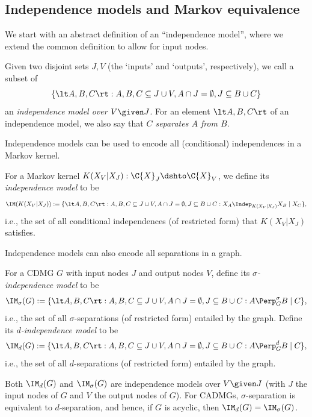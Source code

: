 \subsection{Independence models and Markov equivalence}

We start with an abstract definition of an ``independence model'', where we extend the common definition to allow for input nodes.
\begin{Def}\label{def:independence_model}
  Given two disjoint sets $J,V$ (the `inputs' and `outputs', respectively), we call a subset of 
  $$\{ \lt A, B, C \rt : A, B, C \subseteq J \cup V, A \cap J = \emptyset, J \subseteq B \cup C  \}$$
  an \emph{independence model over $V \given J$}.
  For an element $\lt A, B, C \rt$ of an independence model, we also say that \emph{$C$ separates $A$ from $B$}.
\end{Def}

Independence models can be used to encode all (conditional) independences in a Markov kernel.
\begin{Def}\label{def:independence_model_Markov_kernel}
  For a Markov kernel $K(X_V|X_J) : \C{X}_J \dshto \C{X}_V$, we define its \emph{independence model} to be
  $$\IM(K(X_V | X_J)) := \{ \lt A, B, C \rt : A, B, C \subseteq J \cup V, A \cap J = \emptyset, J \subseteq B \cup C : X_A \Indep_{K(X_V | X_J)} X_B \mid X_C \},$$
  i.e., the set of all conditional independences (of restricted form) that $K(X_V|X_J)$ satisfies.
\end{Def}

Independence models can also encode all separations in a graph.
\begin{Def}\label{def:independence_model_graph}
  For a CDMG $G$ with input nodes $J$ and output nodes $V$, define its \emph{$\sigma$-independence model} to be
  $$\IM_\sigma(G) := \{ \lt A, B, C \rt : A, B, C \subseteq J \cup V, A \cap J = \emptyset, J \subseteq B \cup C : A \Perp_G^\sigma B \mid C \},$$
  i.e., the set of all $\sigma$-separations (of restricted form) entailed by the graph. 
  Define its \emph{$d$-independence model} to be
  $$\IM_d(G) := \{ \lt A, B, C \rt : A, B, C \subseteq J \cup V, A \cap J = \emptyset, J \subseteq B \cup C : A \Perp_G^d B \mid C \},$$
  i.e., the set of all $d$-separations (of restricted form) entailed by the graph.
\end{Def}
Both $\IM_d(G)$ and $\IM_\sigma(G)$ are independence models over $V \given J$ (with $J$ the input nodes of $G$ and $V$ the output nodes of $G$).
For CADMGs, $\sigma$-separation is equivalent to $d$-separation, and hence, if $G$ is acyclic, then $\IM_d(G) = \IM_\sigma(G)$.

